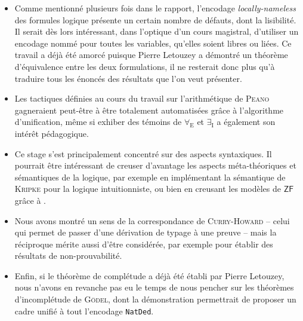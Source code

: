 \documentclass[a4paper]{article}
\newcommand{\ZF}{\mathsf{ZF}}
\begin{document}
\begin{itemize}[label=$\bigstar$]
\item Comme mentionné plusieurs fois dans le rapport, l'encodage \emph{locally-nameless} des formules logique présente un certain nombre de défauts, dont la lisibilité. Il serait dès lors intéressant, dans l'optique d'un cours magistral, d'utiliser un encodage nommé pour toutes les variables, qu'elles soient libres ou liées. Ce travail a déjà été amorcé puisque Pierre Letouzey a démontré un théorème d'équivalence entre les deux formulations, il ne resterait donc plus qu'à traduire tous les énoncés des résultats que l'on veut présenter.

\item Les tactiques définies au cours du travail sur l'arithmétique de \textsc{Peano} gagneraient peut-être à être totalement automatisées grâce à l'algorithme d'unification, même si exhiber des témoins de $\forall_{\mathrm{E}}$ et $\exists_{\mathrm{I}}$ a également son intérêt pédagogique.

\item Ce stage s'est principalement concentré sur des aspects syntaxiques. Il pourrait être intéressant de creuser d'avantage les aspects méta-théoriques et sémantiques de la logique, par exemple en implémentant la sémantique de \textsc{Kripke} pour la logique intuitionniste, ou bien en creusant les modèles de $\ZF$ grâce à \cite{zfmod}.

\item Nous avons montré un sens de la correspondance de \textsc{Curry-Howard} -- celui qui permet de passer d'une dérivation de typage à une preuve -- mais la réciproque mérite aussi d'être considérée, par exemple pour établir des résultats de non-prouvabilité.

\item Enfin, si le théorème de complétude a déjà été établi par Pierre Letouzey, nous n'avons en revanche pas eu le temps de nous pencher sur les théorèmes d'incomplétude de \textsc{Gödel}, dont la démonstration permettrait de proposer un cadre unifié à tout l'encodage \verb+NatDed+.
\end{itemize}

\newpage



\nocite{*}


\appendix
{}
\newpage
\end{document}
